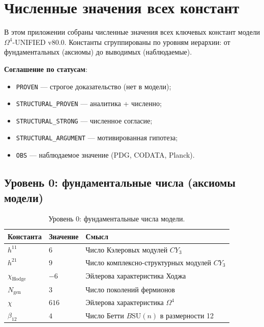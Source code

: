 \documentclass[11pt,a4paper]{article}
\newcommand{\SU}{\ensuremath{\mathrm{SU}}}
\newcommand{\CY}{\ensuremath{CY_3}}
\newcommand{\Om}{\ensuremath{\Omega^4}}
\theoremstyle{definition}
\begin{document}
\appendix

\section{Численные значения всех констант}
\label{app:numbers}

В этом приложении собраны численные значения всех ключевых
констант модели $\Om$-UNIFIED v80.0. Константы сгруппированы
по уровням иерархии: от фундаментальных (аксиомы) до выводимых
(наблюдаемые).

\medskip\noindent
\textbf{Соглашение по статусам}:
\begin{itemize}
    \item \texttt{PROVEN} — строгое доказательство (нет в модели);
    \item \texttt{STRUCTURAL\_PROVEN} — аналитика + численно;
    \item \texttt{STRUCTURAL\_STRONG} — численное согласие;
    \item \texttt{STRUCTURAL\_ARGUMENT} — мотивированная гипотеза;
    \item \texttt{OBS} — наблюдаемое значение (PDG, CODATA, Planck).
\end{itemize}

\subsection{Уровень 0: фундаментальные числа (аксиомы модели)}
\label{app:level-0}

\begin{table}[ht]
\centering
\caption{Уровень 0: фундаментальные числа модели.}
\label{tab:app-level-0}
\begin{tabular}{lll}
\toprule
Константа & Значение & Смысл \\
\midrule
$h^{11}$ & $6$ & Число Кэлеровых модулей $\CY$ \\
$h^{21}$ & $9$ & Число комплексно-структурных модулей $\CY$ \\
$\chi_{\text{Hodge}}$ & $-6$ & Эйлерова характеристика Ходжа \\
$N_{\text{gen}}$ & $3$ & Число поколений фермионов \\
$\chi$ & $616$ & Эйлерова характеристика $\Om$ \\
$\beta_{12}$ & $4$ & Число Бетти $B\SU(n)$ в размерности 12 \\
\bottomrule
\end{tabular}
\end{table}
\end{document}
